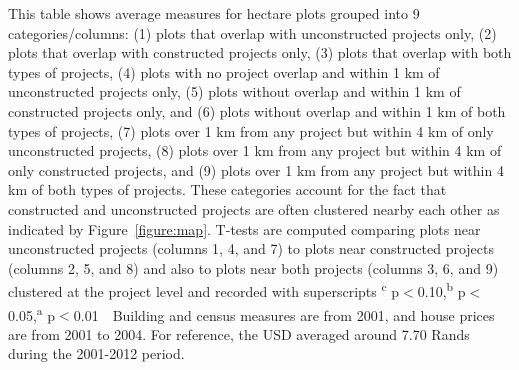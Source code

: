 \documentclass[12pt]{article}
\begin{document}
\begin{table}[h!]
{\begin{threeparttable}
\begin{tablenotes}
\item \footnotesize This table shows average measures for hectare plots grouped into 9 categories/columns: (1) plots that overlap with unconstructed projects only, (2) plots that overlap with constructed projects only, (3) plots that overlap with both types of projects, (4) plots with no project overlap and within 1 km of unconstructed projects only, (5) plots without overlap and within 1 km of constructed projects only, and (6) plots without overlap and within 1 km of both types of projects, (7) plots over 1 km from any project but within 4 km of only unconstructed projects, (8) plots over 1 km from any project but within 4 km of only constructed projects, and (9) plots over 1 km from any project but within 4 km of both types of projects.  These categories account for the fact that constructed and unconstructed projects are often clustered nearby each other as indicated by Figure~\ref{figure:map}.  T-tests are computed comparing plots near unconstructed projects (columns 1, 4, and 7) to plots near constructed projects (columns 2, 5, and 8) and also to plots near both projects (columns 3, 6, and 9) clustered at the project level and recorded with superscripts \textsuperscript{c} p$<$0.10,\textsuperscript{b} p$<$0.05,\textsuperscript{a} p$<$0.01 \,\, Building and census measures are from 2001, and house prices are from 2001 to 2004.  For reference, the USD averaged around 7.70 Rands during the 2001-2012 period.  
\end{tablenotes}
\end{threeparttable}
}
\end{table} 






\end{document}
